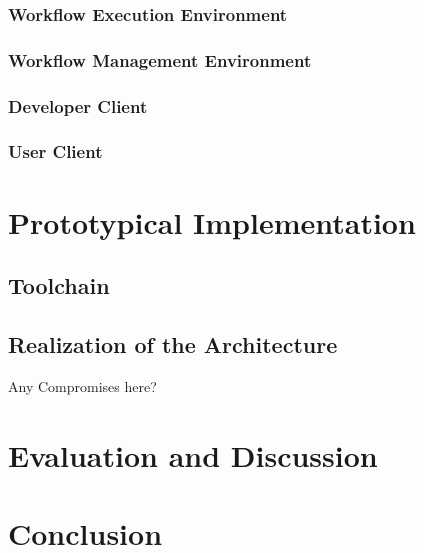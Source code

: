 \documentclass[language=english,noinputenc]{wiwwuwordrprt}
\begin{document}
      \subsection{Workflow Execution Environment} %
      \label{sub:workflow_execution_environment}

      \subsection{Workflow Management Environment} %
      \label{sub:workflow_management}

      \subsection{Developer Client} %
      \label{sub:developer_client}


      \subsection{User Client} %
      \label{sub:user_client}




  \chapter{Prototypical Implementation} %
  \label{cha:implementation}

    \section{Toolchain} %
    \label{sec:toolchain}


    \section{Realization of the Architecture} %
    \label{sec:realization_of_the_architecture}
    Any Compromises here?


  \chapter{Evaluation and Discussion} %
  \label{cha:evaluation}


  \chapter{Conclusion} %
  \label{cha:conclusion}


  
  
\end{document}
